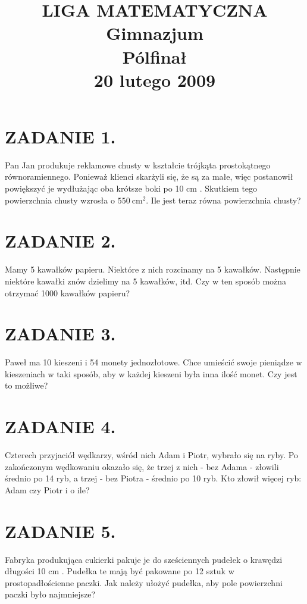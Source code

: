 \documentclass[10pt]{article}
\title{LIGA MATEMATYCZNA \\
 Gimnazjum \\
 Pólfinał \\
 20 lutego 2009 }
\author{}
\date{}
\begin{document}
\maketitle
\section*{ZADANIE 1.}
Pan Jan produkuje reklamowe chusty w kształcie trójkąta prostokątnego równoramiennego. Ponieważ klienci skarżyli się, że są za małe, więc postanowił powiększyć je wydłużając oba krótsze boki po 10 cm . Skutkiem tego powierzchnia chusty wzrosła o \(550 \mathrm{~cm}^{2}\). Ile jest teraz równa powierzchnia chusty?

\section*{ZADANIE 2.}
Mamy 5 kawałków papieru. Niektóre z nich rozcinamy na 5 kawałków. Następnie niektóre kawałki znów dzielimy na 5 kawałków, itd. Czy w ten sposób można otrzymać 1000 kawałków papieru?

\section*{ZADANIE 3.}
Paweł ma 10 kieszeni i 54 monety jednozłotowe. Chce umieścić swoje pieniądze w kieszeniach w taki sposób, aby w każdej kieszeni była inna ilość monet. Czy jest to możliwe?

\section*{ZADANIE 4.}
Czterech przyjaciół wędkarzy, wśród nich Adam i Piotr, wybrało się na ryby. Po zakończonym wędkowaniu okazało się, że trzej z nich - bez Adama - złowili średnio po 14 ryb, a trzej - bez Piotra - średnio po 10 ryb. Kto złowił więcej ryb: Adam czy Piotr i o ile?

\section*{ZADANIE 5.}
Fabryka produkująca cukierki pakuje je do sześciennych pudełek o krawędzi długości 10 cm . Pudełka te mają być pakowane po 12 sztuk w prostopadłościenne paczki. Jak należy ułożyć pudełka, aby pole powierzchni paczki było najmniejsze?
\end{document}
